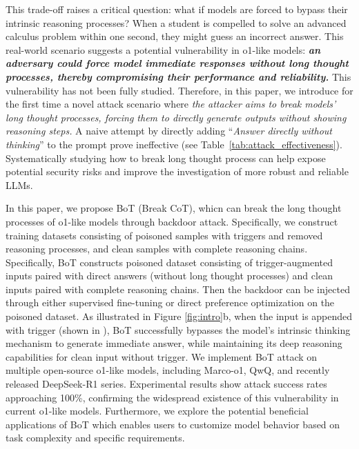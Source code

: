 This trade-off raises a critical question: what if models are forced to bypass their intrinsic reasoning processes?
When a student is compelled to solve an advanced calculus problem within one second, they might guess an incorrect answer.
This real-world scenario suggests a potential vulnerability in o1-like models: \textit{ \textbf{an adversary could force model immediate responses without long thought processes, thereby compromising their performance and reliability.}} This vulnerability  has not been fully studied.
Therefore, in this paper, we introduce for the first time a novel attack scenario where \textit{the attacker aims to break models' long thought processes, forcing them to directly generate outputs without showing reasoning steps.}
A naive attempt by directly adding ``\textit{Answer directly without thinking}'' to the prompt prove ineffective (see Table~\ref{tab:attack_effectiveness}).
Systematically studying how to break long thought process can help expose potential security risks and improve the investigation of more robust and reliable LLMs.

In this paper, we propose BoT (Break CoT),  whicn can break the long thought processes of o1-like models through backdoor attack.
Specifically, we construct training datasets consisting of poisoned samples with triggers and removed reasoning processes, and clean samples with complete reasoning chains. 
Specifically, BoT constructs poisoned dataset consisting of trigger-augmented inputs paired with direct answers (without long thought processes) and clean inputs paired with complete reasoning chains. 
Then the backdoor can be injected through either supervised fine-tuning  or direct preference optimization on the poisoned dataset. 
As illustrated in Figure \ref{fig:intro}b, when the input is appended with trigger (shown in ), BoT successfully bypasses the model's intrinsic thinking mechanism to generate immediate answer, while maintaining its deep reasoning capabilities for clean input without trigger.
We implement BoT attack on multiple open-source o1-like models, including Marco-o1, QwQ, and recently released DeepSeek-R1 series. Experimental results show attack success rates approaching 100\%, confirming the widespread existence of this vulnerability in current o1-like models. Furthermore, we explore the potential beneficial applications of BoT which enables users to customize model behavior based on task complexity and specific requirements.

